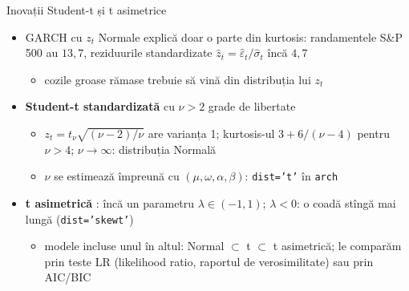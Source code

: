 \begin{frame}{Inovații Student-t și t asimetrice}
\itemsize{\small}
\begin{itemize}
    \item GARCH cu $z_t$ Normale explică doar o parte din kurtosis: randamentele S\&P 500 au $13{,}7$, reziduurile standardizate $\hat z_t = \hat\varepsilon_t/\hat\sigma_t$ încă $4{,}7$
    \begin{itemize}
        \item cozile groase rămase trebuie să vină din distribuția lui $z_t$
    \end{itemize}
    \item \textbf{Student-t standardizată} cu $\nu > 2$ grade de libertate 
    \begin{itemize}
        \item $z_t = t_\nu\sqrt{(\nu - 2)/\nu}$ are varianța 1; kurtosis-ul $3 + 6/(\nu - 4)$ pentru $\nu > 4$; $\nu \to \infty$: distribuția Normală
        \item $\nu$ se estimează împreună cu $(\mu, \omega, \alpha, \beta)$: \texttt{dist='t'} în \texttt{arch}
    \end{itemize}
    \item \textbf{t asimetrică} : încă un parametru $\lambda \in (-1, 1)$; $\lambda < 0$: o coadă stîngă mai lungă (\texttt{dist='skewt'})
    \begin{itemize}
        \item modele incluse unul în altul: Normal $\subset$ t $\subset$ t asimetrică; le comparăm prin teste LR (likelihood ratio, raportul de verosimilitate) sau prin AIC/BIC
    \end{itemize}
\end{itemize}
\end{frame}

